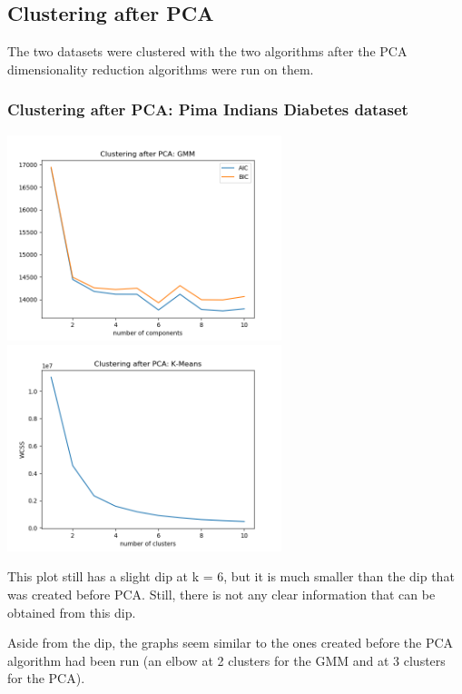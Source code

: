 \documentclass[11pt]{article}
\begin{document}
            \subsection{Clustering after PCA}

            The two datasets were clustered with the two algorithms
            after the PCA dimensionality reduction algorithms were run
            on them.

            \subsubsection{Clustering after PCA: Pima Indians Diabetes dataset}

            \includegraphics[width=8cm]{../pima/clustering2/gmm_pca.png}
            \includegraphics[width=8cm]{../pima/clustering2/km_pca.png}

            This plot still has a slight dip at k = 6, but it is much smaller
            than the dip that was created before PCA. Still, there is not any clear
            information that can be obtained from this dip.

            Aside from the dip, the graphs seem similar to the ones created before
            the PCA algorithm had been run (an elbow at 2 clusters for the GMM
            and at 3 clusters for the PCA).
\end{document}
